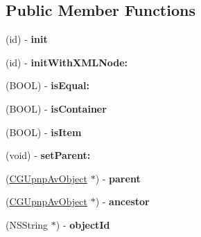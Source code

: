\subsection*{Public Member Functions}
\begin{DoxyCompactItemize}
\item 
\hypertarget{interface_c_g_upnp_av_object_a5250286b2312f1070df26701db3eeac4}{(id) -\/ {\bfseries init}}\label{interface_c_g_upnp_av_object_a5250286b2312f1070df26701db3eeac4}

\item 
\hypertarget{interface_c_g_upnp_av_object_a488d8cf3906c66b299d644937700b5ac}{(id) -\/ {\bfseries init\-With\-X\-M\-L\-Node\-:}}\label{interface_c_g_upnp_av_object_a488d8cf3906c66b299d644937700b5ac}

\item 
\hypertarget{interface_c_g_upnp_av_object_a389cabe1c8f6aa44a31792e24f86eff3}{(B\-O\-O\-L) -\/ {\bfseries is\-Equal\-:}}\label{interface_c_g_upnp_av_object_a389cabe1c8f6aa44a31792e24f86eff3}

\item 
\hypertarget{interface_c_g_upnp_av_object_ae36601bd025c057c0d9fc732a641b289}{(B\-O\-O\-L) -\/ {\bfseries is\-Container}}\label{interface_c_g_upnp_av_object_ae36601bd025c057c0d9fc732a641b289}

\item 
\hypertarget{interface_c_g_upnp_av_object_a6da43c5bfe6fe575b58ce931be27d869}{(B\-O\-O\-L) -\/ {\bfseries is\-Item}}\label{interface_c_g_upnp_av_object_a6da43c5bfe6fe575b58ce931be27d869}

\item 
\hypertarget{interface_c_g_upnp_av_object_a25d6ad81a1b48eb01c8c4ddb8add50df}{(void) -\/ {\bfseries set\-Parent\-:}}\label{interface_c_g_upnp_av_object_a25d6ad81a1b48eb01c8c4ddb8add50df}

\item 
\hypertarget{interface_c_g_upnp_av_object_a0f6835b506c0987b31ca5bbc6e46d577}{(\hyperlink{interface_c_g_upnp_av_object}{C\-G\-Upnp\-Av\-Object} $\ast$) -\/ {\bfseries parent}}\label{interface_c_g_upnp_av_object_a0f6835b506c0987b31ca5bbc6e46d577}

\item 
\hypertarget{interface_c_g_upnp_av_object_a30d5ead9afc53c2284ab229a3a3e27e9}{(\hyperlink{interface_c_g_upnp_av_object}{C\-G\-Upnp\-Av\-Object} $\ast$) -\/ {\bfseries ancestor}}\label{interface_c_g_upnp_av_object_a30d5ead9afc53c2284ab229a3a3e27e9}

\item 
\hypertarget{interface_c_g_upnp_av_object_a81d80baef471c05ada0f354efebc36cc}{(N\-S\-String $\ast$) -\/ {\bfseries object\-Id}}\label{interface_c_g_upnp_av_object_a81d80baef471c05ada0f354efebc36cc}


\end{DoxyCompactItemize}
